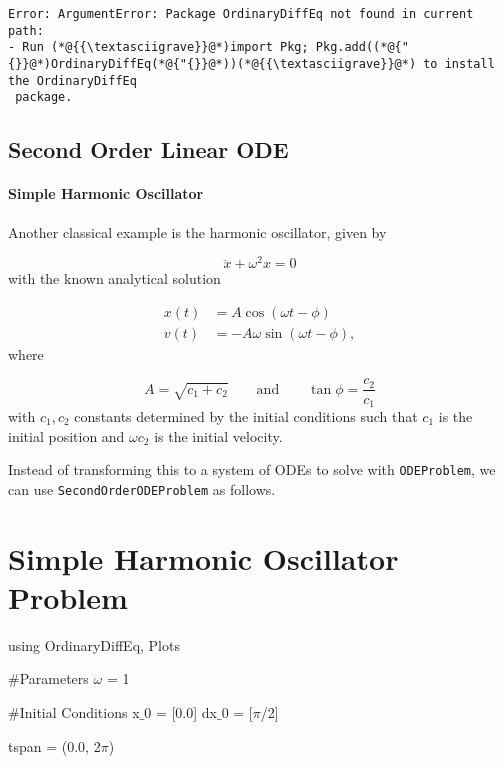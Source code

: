 \documentclass[12pt,a4paper]{article}
\begin{document}
\begin{lstlisting}
Error: ArgumentError: Package OrdinaryDiffEq not found in current path:
- Run (*@{{\textasciigrave}}@*)import Pkg; Pkg.add((*@{"{}}@*)OrdinaryDiffEq(*@{"{}}@*))(*@{{\textasciigrave}}@*) to install the OrdinaryDiffEq
 package.
\end{lstlisting}


\subsection{Second Order Linear ODE}
\paragraph{Simple Harmonic Oscillator}
Another classical example is the harmonic oscillator, given by

\[
\ddot{x} + \omega^2 x = 0
\]
with the known analytical solution


\begin{align*}
x(t) &= A\cos(\omega t - \phi) \\
v(t) &= -A\omega\sin(\omega t - \phi),
\end{align*}
where

\[
A = \sqrt{c_1 + c_2} \qquad\text{and}\qquad \tan \phi = \frac{c_2}{c_1}
\]
with $c_1, c_2$ constants determined by the initial conditions such that $c_1$ is the initial position and $\omega c_2$ is the initial velocity.

Instead of transforming this to a system of ODEs to solve with \texttt{ODEProblem}, we can use \texttt{SecondOrderODEProblem} as follows.


\section{Simple Harmonic Oscillator Problem}
using OrdinaryDiffEq, Plots

\#Parameters \ensuremath{\omega} = 1

\#Initial Conditions x\ensuremath{\_0} = [0.0] dx\ensuremath{\_0} = [\ensuremath{\pi}/2]

tspan = (0.0, 2\ensuremath{\pi})
\end{document}
